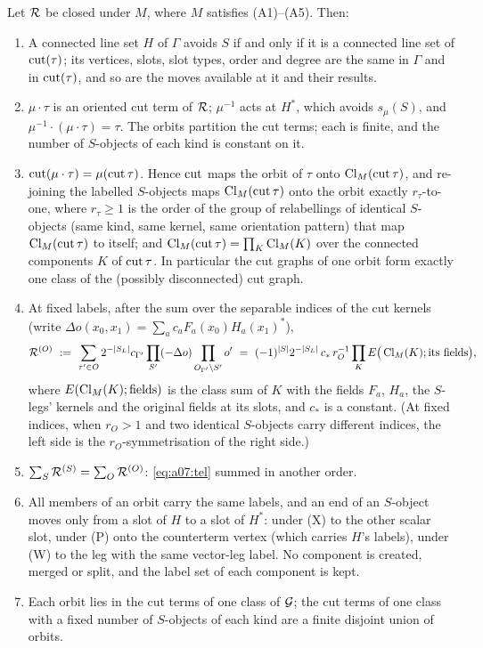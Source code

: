 \begin{lemma}\label{lem:a07:orb}
Let $\mathcal R$ be closed under $M$, where $M$ satisfies \textup{(A1)--(A5)}. Then:
\begin{enumerate}[label=\textup{(\alph*)},nosep,leftmargin=*]
\item A connected line set $H$ of $\Gamma$ avoids $S$ if and only if it is a connected line set of $\operatorname{cut}(\tau)$; its vertices, slots, slot types, order and degree are the same in $\Gamma$ and in $\operatorname{cut}(\tau)$, and so are the moves available at it and their results.
\item $\mu\cdot\tau$ is an oriented cut term of $\mathcal R$; $\mu^{-1}$ acts at $H^*$, which avoids $s_\mu(S)$, and $\mu^{-1}\cdot(\mu\cdot\tau)=\tau$. The orbits partition the cut terms; each is finite, and the number of $S$-objects of each kind is constant on it.
\item $\operatorname{cut}(\mu\cdot\tau)=\mu(\operatorname{cut}\tau)$. Hence $\operatorname{cut}$ maps the orbit of $\tau$ onto $\operatorname{Cl}_M(\operatorname{cut}\tau)$, and re-joining the labelled $S$-objects maps $\operatorname{Cl}_M(\operatorname{cut}\tau)$ onto the orbit exactly $r_\tau$-to-one, where $r_\tau\ge1$ is the order of the group of relabellings of identical $S$-objects (same kind, same kernel, same orientation pattern) that map $\operatorname{Cl}_M(\operatorname{cut}\tau)$ to itself; and $\operatorname{Cl}_M(\operatorname{cut}\tau)=\prod_K\operatorname{Cl}_M(K)$ over the connected components $K$ of $\operatorname{cut}\tau$. In particular the cut graphs of one orbit form exactly one class of the (possibly disconnected) cut graph.
\item At fixed labels, after the sum over the separable indices of the cut kernels (write $\Delta o(x_0,x_1)=\sum_a c_aF_a(x_0)H_a(x_1)^*$),
\[
\cR^{(O)}\ \defeq\ \sum_{\tau'\in O}2^{-|S_L|}c_{\Gamma'}\prod_{S'}(-\Delta o)\prod_{O_{\Gamma'}\setminus S'}o'\ =\ (-1)^{|S|}2^{-|S_L|}\,c_*\,r_O^{-1}\prod_KE\big(\Cl_M(K);\text{its fields}\big),
\]
where $E(\operatorname{Cl}_M(K);\text{fields})$ is the class sum of $K$ with the fields $F_a$, $H_a$, the $S$-legs' kernels and the original fields at its slots, and $c_*$ is a constant. (At fixed indices, when $r_O>1$ and two identical $S$-objects carry different indices, the left side is the $r_O$-symmetrisation of the right side.)
\item $\sum_S\mathcal R^{(S)}=\sum_O\mathcal R^{(O)}$: \eqref{eq:a07:tel} summed in another order.
\item All members of an orbit carry the same labels, and an end of an $S$-object moves only from a slot of $H$ to a slot of $H^*$: under \textup{(X)} to the other scalar slot, under \textup{(P)} onto the counterterm vertex (which carries $H$'s labels), under \textup{(W)} to the leg with the same vector-leg label. No component is created, merged or split, and the label set of each component is kept.
\item Each orbit lies in the cut terms of one class of $\mathcal G$; the cut terms of one class with a fixed number of $S$-objects of each kind are a finite disjoint union of orbits.
\end{enumerate}
\end{lemma}

